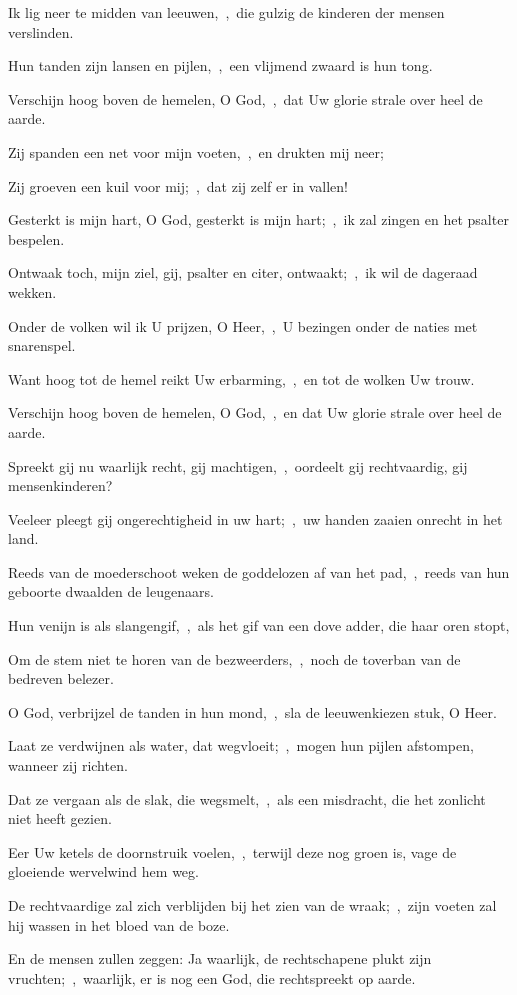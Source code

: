\documentclass[12pt,twoside,a5paper]{article}
\begin{document}
\begin{halfparskip}
  Ik lig neer te midden van leeuwen,~\sep\ die gulzig de kinderen der mensen verslinden.

  Hun tanden zijn lansen en pijlen,~\sep\ een vlijmend zwaard is hun tong.

  Verschijn hoog boven de hemelen, O God,~\sep\ dat Uw glorie strale over heel de aarde.

  Zij spanden een net voor mijn voeten,~\sep\ en drukten mij neer;

  Zij groeven een kuil voor mij;~\sep\ dat zij zelf er in vallen!

  Gesterkt is mijn hart, O God, gesterkt is mijn hart;~\sep\ ik zal zingen en het psalter bespelen.

  Ontwaak toch, mijn ziel, gij, psalter en citer, ontwaakt;~\sep\ ik wil de dageraad wekken.

  Onder de volken wil ik U prijzen, O Heer,~\sep\ U bezingen onder de naties met snarenspel.

  Want hoog tot de hemel reikt Uw erbarming,~\sep\ en tot de wolken Uw trouw.

  Verschijn hoog boven de hemelen, O God,~\sep\ en dat Uw glorie strale over heel de aarde.

   Spreekt gij nu waarlijk recht, gij machtigen,~\sep\ oordeelt gij rechtvaardig, gij mensenkinderen?

  Veeleer pleegt gij ongerechtigheid in uw hart;~\sep\ uw handen zaaien onrecht in het land.

  Reeds van de moederschoot weken de goddelozen af van het pad,~\sep\ reeds van hun geboorte dwaalden de leugenaars.

  Hun venijn is als slangengif,~\sep\ als het gif van een dove adder, die haar oren stopt,

  Om de stem niet te horen van de bezweerders,~\sep\ noch de toverban van de bedreven belezer.

  O God, verbrijzel de tanden in hun mond,~\sep\ sla de leeuwenkiezen stuk, O Heer.

  Laat ze verdwijnen als water, dat wegvloeit;~\sep\ mogen hun pijlen afstompen, wanneer zij richten.

  Dat ze vergaan als de slak, die wegsmelt,~\sep\ als een misdracht, die het zonlicht niet heeft gezien.

  Eer Uw ketels de doornstruik voelen,~\sep\ terwijl deze nog groen is, vage de gloeiende wervelwind hem weg.

  De rechtvaardige zal zich verblijden bij het zien van de wraak;~\sep\ zijn voeten zal hij wassen in het bloed van de boze.

  En de mensen zullen zeggen: Ja waarlijk, de rechtschapene plukt zijn vruchten;~\sep\ waarlijk, er is nog een God, die rechtspreekt op aarde.
\end{halfparskip}
\end{document}
